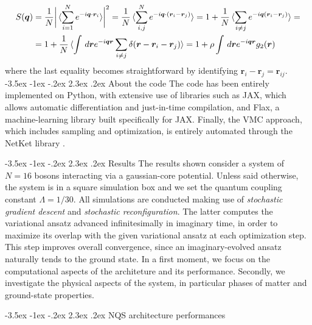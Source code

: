 \documentclass[a4paper, 12pt, oneside]{article}
\makeatletter
\renewcommand{\section}{\@startsection{section}{1}{\z@}%
             {-3.5ex \@plus-1ex \@minus-.2ex}%
             {2.3ex \@plus.2ex}%
             {\normalfont\large\bfseries}}
\renewcommand{\subsection}{\@startsection{subsection}{1}{\z@}%
             {-3.5ex \@plus-1ex \@minus-.2ex}%
             {2.3ex \@plus.2ex}%
             {\normalfont\normalsize\bfseries}}
\makeatother
\begin{document}
\begin{equation}
    \begin{split}
    S(\bm{q}) &= \dfrac{1}{N}\biggr|\braket{\sum_{i=1}^N e^{-i\bm{q} \cdot \bm{r}_i}}\biggr|^2    
    = \dfrac{1}{N}\braket{\sum_{i,j}^N e^{-i\bm{q} \cdot (\bm{r}_i-\bm{r}_j)}} =
    1 + \dfrac{1}{N}\braket{\sum_{i\neq j}e^{-i\bm{q}(\bm{r}_i-\bm{r}_j)}} = \\ 
    &= 1 + \dfrac{1}{N}\braket{\int \,d\bm{r} e^{-i\bm{qr}} \sum_{i\neq j}\delta(\bm{r}-\bm{r}_i-\bm{r}_j)}  =
    1+\rho\int \,d\bm{r} e^{-i\bm{qr}} g_2(\bm{r})
    \end{split}
\end{equation}
where the last equality becomes straightforward by identifying $\bm{r}_i-\bm{r}_j = \bm{r}_{ij}$. 
\subsection{About the code}
The code has been entirely implemented on Python, with extensive use of libraries such as JAX, 
which allows automatic differentiation and just-in-time compilation, and Flax, a machine-learning library built 
specifically for JAX. Finally, the VMC approach, which includes sampling and optimization, is entirely automated through the NetKet library \cite{vicentini_2022}. 

\section{Results}\label{sec:results}
The results shown consider a system of $N=16$ bosons interacting via a 
gaussian-core potential. Unless said otherwise, the system is in a square simulation box and 
we set the quantum coupling constant $\Lambda = 1/30$. All simulations are conducted making use of 
\textit{stochastic gradient descent} and \textit{stochastic reconfiguration}. The latter computes the 
variational ansatz advanced infinitesimally in imaginary time, in order to maximize its overlap with the given variational ansatz 
at each optimization step. This step improves overall convergence, since an imaginary-evolved ansatz naturally tends 
to the ground state. In a first moment, we focus on the computational aspects of the architeture and its performance. Secondly, 
we investigate the physical aspects of the system, in particular phases of matter and ground-state properties.

\subsection{NQS architecture performances}
\end{document}
